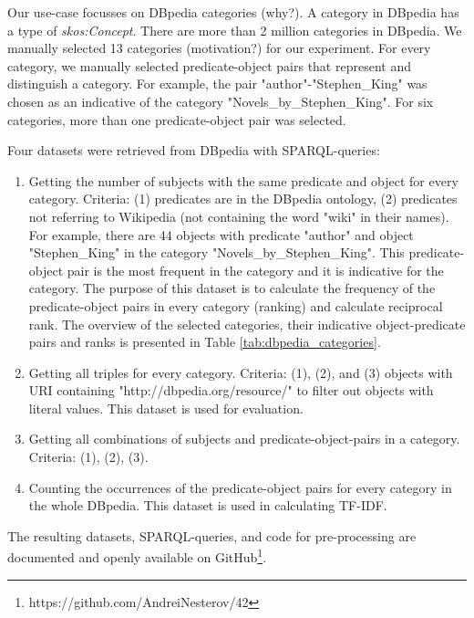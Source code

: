 \noindent
Our use-case focusses on DBpedia categories (why?). A category in DBpedia has a type of \textit{skos:Concept}.
There are more than 2 million categories in DBpedia. We manually selected 13 categories (motivation?) for our experiment.
For every category, we manually selected predicate-object pairs that represent and distinguish a category.
For example, the pair "author"-"Stephen\_King" was chosen as an indicative of the category "Novels\_by\_Stephen\_King".
For six categories, more than one predicate-object pair was selected. 

Four datasets were retrieved from DBpedia with SPARQL-queries:
\begin{enumerate}
\item Getting the number of subjects with the same predicate and object for every category.
Criteria: (1) predicates are in the DBpedia ontology, (2) predicates not referring to Wikipedia (not containing the word "wiki" in their names).
For example, there are 44 objects with predicate "author" and object "Stephen\_King" in the category "Novels\_by\_Stephen\_King".
This predicate-object pair is the most frequent in the category and it is indicative for the category.
The purpose of this dataset is to calculate the frequency of the predicate-object pairs in every category (ranking) and calculate reciprocal rank.
The overview of the selected categories, their indicative object-predicate pairs and ranks is presented in Table \ref{tab:dbpedia_categories}.
\item  Getting all triples for every category. Criteria: (1), (2), and (3) objects with URI containing "http://dbpedia.org/resource/" to filter out objects with literal values.
This dataset is used for evaluation.
\item Getting all combinations of subjects and predicate-object-pairs in a category.
Criteria: (1), (2), (3).
\item Counting the occurrences of the predicate-object pairs for every category in the whole DBpedia.
This dataset is used in calculating TF-IDF.
\end{enumerate}

The resulting datasets, SPARQL-queries, and code for pre-processing are documented and openly available on GitHub\footnote{https://github.com/AndreiNesterov/42}.

